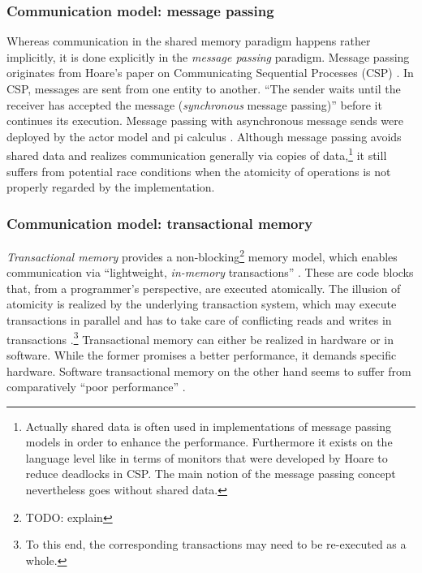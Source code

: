 \subsubsection{Communication model: message passing}
Whereas communication in the shared memory paradigm happens rather implicitly, it is done explicitly in the \textit{message passing} paradigm. Message passing originates from Hoare's paper on Communicating Sequential Processes (CSP) \cite{CommunicatingSequentialProcesses}. In CSP, messages are sent from one entity to another. ``The sender waits until the receiver has accepted the message (\textit{synchronous} message passing)'' \cite[p.~138]{DistributedSharedMemory} before it continues its execution. Message passing with asynchronous message sends were deployed by the actor model \cite{UniversalModularACTORFormalism} and pi calculus \cite{ThePolyadicPi-Calculus}. Although message passing avoids shared data and realizes communication generally via copies of data,\footnote{Actually shared data is often used in implementations of message passing models in order to enhance the performance. Furthermore it exists on the language level like in terms of monitors that were developed by Hoare to reduce deadlocks in CSP. The main notion of the message passing concept nevertheless goes without shared data.} it still suffers from potential race conditions \cite{DebuggingRaceConditions} when the atomicity of operations is not properly regarded by the implementation.

\subsubsection{Communication model: transactional memory}
\textit{Transactional memory} provides a non-blocking\footnote{TODO: explain} memory model, which enables communication via ``lightweight, \textit{in-memory} transactions'' \cite[p.~3]{PrinciplesOfTransactionalMemory}. These are code blocks that, from a programmer's perspective, are executed atomically. The illusion of atomicity is realized by the underlying transaction system, which may execute transactions in parallel and has to take care of conflicting reads and writes in transactions \cite{TransactionalMemory}.\footnote{To this end, the corresponding transactions may need to be re-executed as a whole.} Transactional memory can either be realized in hardware or in software. While the former promises a better performance, it demands specific hardware. Software transactional memory on the other hand seems to suffer from comparatively ``poor performance'' \cite[p.~13]{TransactionalProgrammabilityAndPerformance}.

